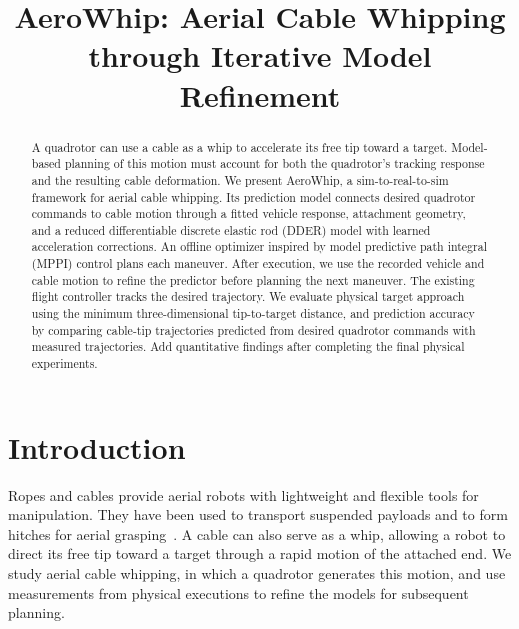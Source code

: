 \documentclass[letterpaper, 10 pt, conference]{ieeeconf}
\newcommand{\Tony}[1]{{\color{orange}#1}}
\begin{document}










\title{\bf AeroWhip: Aerial Cable Whipping through Iterative Model Refinement}


\maketitle

\begin{abstract}
A quadrotor can use a cable as a whip to accelerate its free tip
toward a target. Model-based planning of this motion must account
for both the quadrotor's tracking response and the resulting cable
deformation. We present AeroWhip, a sim-to-real-to-sim framework
for aerial cable whipping. Its prediction model connects desired
quadrotor commands to cable motion through a fitted vehicle
response, attachment geometry, and a reduced differentiable discrete
elastic rod (DDER) model with learned acceleration corrections.
An offline optimizer inspired by model predictive path integral
(MPPI) control plans each maneuver. After execution, we use the
recorded vehicle and cable motion to refine the predictor before
planning the next maneuver. The existing flight controller tracks
the desired trajectory. We evaluate physical target approach using
the minimum three-dimensional tip-to-target distance, and prediction
accuracy by comparing cable-tip trajectories predicted from desired
quadrotor commands with measured trajectories.
\Tony{Add quantitative findings after completing the final physical experiments.}
\end{abstract}

\IEEEpeerreviewmaketitle

\section{Introduction}
\label{sec:introduction}

Ropes and cables provide aerial robots with lightweight and flexible
tools for manipulation. They have been used to transport suspended
payloads and to form hitches for aerial
grasping~\cite{sreenath2013trajectory,hitch}. A cable can also serve
as a whip, allowing a robot to direct its free tip toward a target
through a rapid motion of the attached end. We study aerial cable
whipping, in which a quadrotor generates this motion, and use
measurements from physical executions to refine the models for
subsequent planning.
\end{document}
